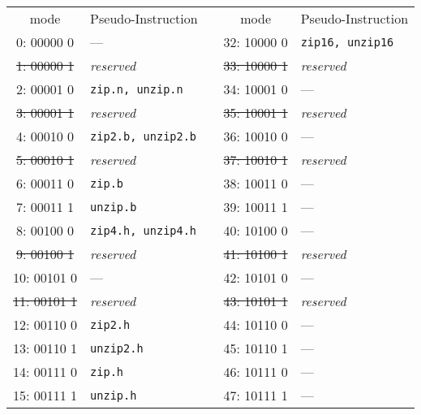 \begin{table}[h]
\begin{small}
\begin{center}
\begin{tabular}{c l p{1in} c l}
      mode     & Pseudo-Instruction       &   &         mode     & Pseudo-Instruction      \\

\cline{1-2}
\cline{4-5}

       0: 00000 0  & ---                      &   &         32: 10000 0  & {\tt zip16, unzip16}    \\
\sout{ 1: 00000 1} & {\it reserved}           &   &   \sout{33: 10000 1} & {\it reserved}          \\
       2: 00001 0  & {\tt zip.n, unzip.n}     &   &         34: 10001 0  & ---                     \\
\sout{ 3: 00001 1} & {\it reserved}           &   &   \sout{35: 10001 1} & {\it reserved}          \\
       4: 00010 0  & {\tt zip2.b, unzip2.b}   &   &         36: 10010 0  & ---                     \\
\sout{ 5: 00010 1} & {\it reserved}           &   &   \sout{37: 10010 1} & {\it reserved}          \\
       6: 00011 0  & {\tt zip.b}              &   &         38: 10011 0  & ---                     \\
       7: 00011 1  & {\tt unzip.b}            &   &         39: 10011 1  & ---                     \\

\cline{1-2}
\cline{4-5}

       8: 00100 0  & {\tt zip4.h, unzip4.h}   &   &         40: 10100 0  & ---                     \\
\sout{ 9: 00100 1} & {\it reserved}           &   &   \sout{41: 10100 1} & {\it reserved}          \\
      10: 00101 0  & ---                      &   &         42: 10101 0  & ---                     \\
\sout{11: 00101 1} & {\it reserved}           &   &   \sout{43: 10101 1} & {\it reserved}          \\
      12: 00110 0  & {\tt zip2.h}             &   &         44: 10110 0  & ---                     \\
      13: 00110 1  & {\tt unzip2.h}           &   &         45: 10110 1  & ---                     \\
      14: 00111 0  & {\tt zip.h}              &   &         46: 10111 0  & ---                     \\
      15: 00111 1  & {\tt unzip.h}            &   &         47: 10111 1  & ---                     \\


\end{tabular}
\end{center}
\end{small}
\end{table}
